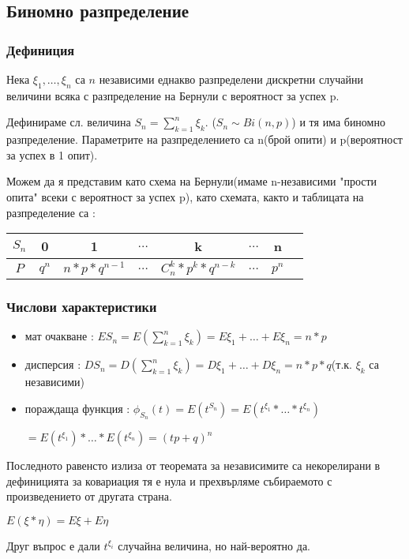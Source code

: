 \documentclass[fleqn,12pt]{article}
\begin{document}
\begin{justify}
\subsection{Биномно разпределение}
\subsubsection{Дефиниция}
Нека $\xi_1, \dots, \xi_n$ са $n$ независими еднакво разпределени дискретни случайни величини всяка с разпределение на 
Бернули с вероятност за успех p.

Дефинираме сл. величина $S_n = \sum_{k=1}^n \xi_k$. ($S_n \sim Bi(n,p)$) и тя има биномно разпределение. Параметрите на 
разпределението са n(брой опити) и p(вероятност за успех в 1 опит).

Можем да я представим като схема на Бернули(имаме n-независими "прости опита" всеки с вероятност за успех p), като 
схемата, както и таблицата на разпределение са :

\begin{tabular}{|c|c|c|c|c|c|c|c|}
    \hline
    $S_n$ & 0 & 1 & $\dots$ & k & $\dots$ & n \\
    \hline
    $P$ & $q^n$ & $n*p*q^{n-1}$ & $\dots$ & $C_n^k * p^k * q^{n-k}$ & $\dots$ & $p^n$ \\
    \hline
\end{tabular}

\subsubsection{Числови характеристики}  
\begin{itemize}
    \item мат очакване : $ES_n = E(\sum_{k=1}^n \xi_k) = E\xi_1 + \dots + E\xi_n = n*p$
    \item дисперсия : $DS_n = D(\sum_{k=1}^n \xi_k) = D\xi_1 + \dots + D\xi_n = n*p*q$(т.к. $\xi_k$ са независими)
    \item пораждаща функция : $\phi_{S_n}(t) = E(t^{S_n}) = E(t^{\xi_1} * \dots * t^{\xi_n})$
    
    $=E(t^{\xi_1}) * \dots * E(t^{\xi_n}) = (tp + q)^n$ 
\end{itemize}
    
Последното равенсто излиза от теоремата за независимите са некорелирани в дефиницията за ковариация тя е нула и 
прехвърляме събираемото с произведението от другата страна.

$E(\xi*\eta) = E\xi + E\eta$

Друг въпрос е дали $t^{\xi_i}$ случайна величина, но най-вероятно да.


\end{justify}
\end{document}
